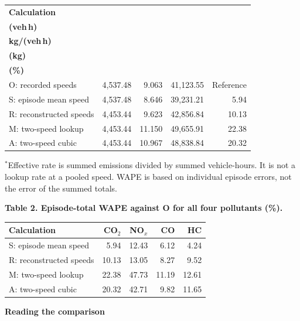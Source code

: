 \documentclass[10pt,a4paper]{article}
\begin{document}
\renewcommand{\arraystretch}{1.65}
\setlength{\tabcolsep}{5pt}
\begin{tabular*}{\linewidth}{@{\extracolsep{\fill}}lrrrr@{}}
\toprule
\textbf{Calculation} & \shortstack{\textbf{Vehicle-hours}\\\textbf{(veh\,h)}} &
\shortstack{\textbf{Effective rate}\!$^{*}$\\\textbf{kg/(veh\,h)}} &
\shortstack{\textbf{Total CO$_2$}\\\textbf{(kg)}} & \shortstack{\textbf{WAPE}\\\textbf{(\%)}}\\
\midrule
O: recorded speeds & 4,537.48 & 9.063 & 41,123.55 & Reference\\\midrule[0.3pt]
S: episode mean speed & 4,537.48 & 8.646 & 39,231.21 & 5.94\\\midrule[0.3pt]
R: reconstructed speeds & 4,453.44 & 9.623 & 42,856.84 & 10.13\\\midrule[0.3pt]
M: two-speed lookup & 4,453.44 & 11.150 & 49,655.91 & 22.38\\\midrule[0.3pt]
A: two-speed cubic & 4,453.44 & 10.967 & 48,838.84 & 20.32\\
\bottomrule
\end{tabular*}
\par\vspace{3pt}
{\small $^{*}$Effective rate is summed emissions divided by summed vehicle-hours. It is not a lookup rate at a pooled speed. WAPE is based on individual episode errors, not the error of the summed totals.}

\vspace{15pt}
\textbf{Table 2. Episode-total WAPE against O for all four pollutants (\%).}

\begin{tabular*}{\linewidth}{@{\extracolsep{\fill}}lrrrr@{}}
\toprule
\textbf{Calculation} & \textbf{CO$_2$} & \textbf{NO$_x$} & \textbf{CO} & \textbf{HC}\\
\midrule
S: episode mean speed & 5.94 & 12.43 & 6.12 & 4.24\\\midrule[0.3pt]
R: reconstructed speeds & 10.13 & 13.05 & 8.27 & 9.52\\\midrule[0.3pt]
M: two-speed lookup & 22.38 & 47.73 & 11.19 & 12.61\\\midrule[0.3pt]
A: two-speed cubic & 20.32 & 42.71 & 9.82 & 11.65\\
\bottomrule
\end{tabular*}

\vspace{13pt}
\textbf{Reading the comparison}
\end{document}
